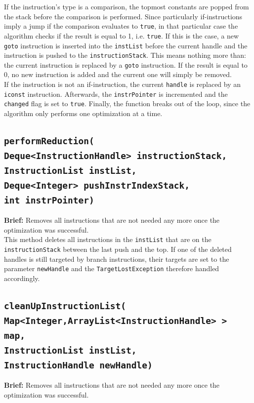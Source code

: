 If the instruction’s type is a comparison, the topmost constants are popped from the stack before the comparison is performed. Since particularly if-instructions imply a jump if the comparison evaluates to \texttt{true}, in that particular case the algorithm checks if the result is equal to 1, i.e. \texttt{true}. If this is the case, a new \texttt{goto} instruction is inserted into the \texttt{instList} before the current handle and the instruction is pushed to the \texttt{instructionStack}. This means nothing more than: the current instruction is replaced by a \texttt{goto} instruction. If the result is equal to 0, no new instruction is added and the current one will simply be removed.\\
If the instruction is not an if-instruction, the current \texttt{handle} is replaced by an \texttt{iconst} instruction. Afterwards, the \texttt{instrPointer} is incremented and the \texttt{changed} flag is set to \texttt{true}. Finally, the function breaks out of the loop, since the algorithm only performs one optimization at a time.

\subsection{\texttt{performReduction(\\
\hspace{2cm}Deque<InstructionHandle> instructionStack, \\
\hspace{2cm}InstructionList instList, \\
\hspace{2cm}Deque<Integer> pushInstrIndexStack, \\
\hspace{2cm}int instrPointer)}}
\label{subsec:performreduction}
\textbf{Brief: }Removes all instructions that are not needed any more once the optimization was successful. \\

This method deletes all instructions in the \texttt{instList} that are on the \texttt{instructionStack} between the last push and the top. If one of the deleted handles is still targeted by branch instructions, their targets are set to the parameter \texttt{newHandle} and the \texttt{TargetLostException} therefore handled accordingly.

\subsection{\texttt{cleanUpInstructionList(\\
\hspace{2cm}Map<Integer,ArrayList<InstructionHandle> > map,\\
\hspace{2cm}InstructionList instList,\\
\hspace{2cm}InstructionHandle newHandle)}}
\label{subsec:cleanup}
\textbf{Brief: }Removes all instructions that are not needed any more once the optimization was successful. \\

